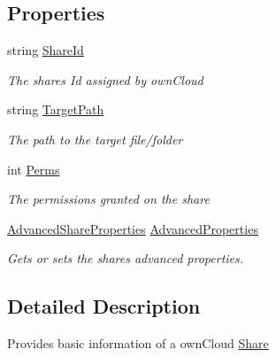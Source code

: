\subsection*{Properties}
\begin{DoxyCompactItemize}
\item 
string \hyperlink{classowncloudsharp_1_1_types_1_1_share_a39b7a60ac0aae1a630516b199e4ecaf3}{Share\+Id}
\begin{DoxyCompactList}\small\item\em The shares Id assigned by own\+Cloud \end{DoxyCompactList}\item 
string \hyperlink{classowncloudsharp_1_1_types_1_1_share_ac2ac95075f60cc369c9f2433f6b4db7d}{Target\+Path}
\begin{DoxyCompactList}\small\item\em The path to the target file/folder \end{DoxyCompactList}\item 
int \hyperlink{classowncloudsharp_1_1_types_1_1_share_a9d6c9011eaba3aa723444e01969bc9b8}{Perms}
\begin{DoxyCompactList}\small\item\em The permissions granted on the share \end{DoxyCompactList}\item 
\hyperlink{classowncloudsharp_1_1_types_1_1_advanced_share_properties}{Advanced\+Share\+Properties} \hyperlink{classowncloudsharp_1_1_types_1_1_share_aeaf2ca3c390ed01433320f86deb53ca5}{Advanced\+Properties}
\begin{DoxyCompactList}\small\item\em Gets or sets the shares advanced properties. \end{DoxyCompactList}\end{DoxyCompactItemize}


\subsection{Detailed Description}
Provides basic information of a own\+Cloud \hyperlink{classowncloudsharp_1_1_types_1_1_share}{Share} 



